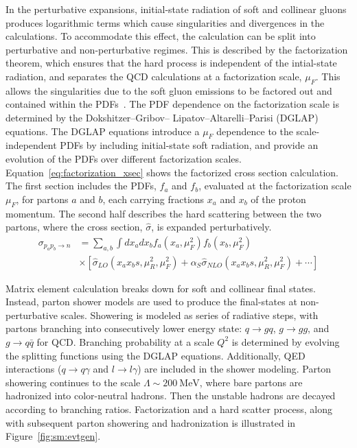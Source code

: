 In the perturbative expansions, initial-state radiation of soft and collinear gluons produces logarithmic terms which cause singularities and divergences in the calculations. To accommodate this effect, the calculation can be split into perturbative and non-perturbative regimes. This is described by the factorization theorem, which ensures that the hard process is independent of the intial-state radiation, and separates the QCD calculations at a factorization scale, $\mu_F$. This allows the singularities due to the soft gluon emissions to be factored out and contained within the PDFs~\cite{Collins:1989gx}. The PDF dependence on the factorization scale is determined by the Dokshitzer–Gribov– Lipatov–Altarelli–Parisi (DGLAP) equations. The DGLAP equations introduce a $\mu_F$ dependence to the scale-independent PDFs by including initial-state soft radiation, and provide an evolution of the PDFs over different factorization scales\cite{Gribov:1972ri,Dokshitzer:1977sg}.  Equation~\ref{eq:factorization_xsec} shows the factorized cross section calculation. The first section includes the PDFs, $f_{a}$ and $f_{b}$, evaluated at the factorization scale $\mu_F$, for partons $a$ and $b$, each carrying fractions $x_a$ and $x_b$ of the proton momentum. The second half describes the hard scattering between the two partons, where the cross section, $\hat{\sigma}$, is expanded perturbatively.  
\begin{equation}
\begin{aligned}
\sigma_{p_a p_b \rightarrow n} &= \sum_{a,b}{\int{dx_a dx_b f_{a}(x_a, \mu^2_F)f_{b}(x_b, \mu^2_F)}} \\ &\times[\hat{\sigma}_{LO}(x_a x_b s, \mu^2_R, \mu^2_F)+\alpha_S \hat{\sigma}_{NLO}(x_a x_b s, \mu^2_R, \mu^2_F) + \cdots]
    \label{eq:factorization_xsec}
\end{aligned}
\end{equation}

Matrix element calculation breaks down for soft and collinear final states. Instead, parton shower models are used to produce the final-states at non-perturbative scales. Showering is modeled as series of radiative steps, with partons branching into consecutively lower energy state: $q\rightarrow gq$, $g\rightarrow gg$, and $g\rightarrow q\bar{q}$ for QCD. Branching probability at a scale $Q^2$ is determined by evolving the splitting functions using the DGLAP equations. Additionally, QED interactions ($q\rightarrow q\gamma$ and $l\rightarrow l\gamma$) are included in the shower modeling. Parton showering continues to the scale $\Lambda\sim 200~\mathrm{MeV}$, where bare partons are hadronized into color-neutral hadrons. Then the unstable hadrons are decayed according to branching ratios. Factorization and a hard scatter process, along with subsequent parton showering and hadronization is illustrated in Figure~\ref{fig:sm:evtgen}.

